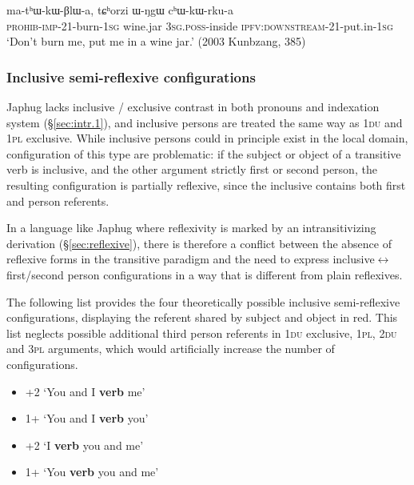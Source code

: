 \begin{exe}
\ex   \label{ex:mathWkWBlWa}
\gll ma-tʰɯ-kɯ-βlɯ-a, tɕʰorzi ɯ-ŋgɯ cʰɯ-kɯ-rku-a \\
\textsc{prohib}-\textsc{imp}-2\fl{}1-burn-\textsc{1sg} wine.jar \textsc{3sg}.\textsc{poss}-inside  \textsc{ipfv}:\textsc{downstream}-2\fl{}1-put.in-\textsc{1sg} \\
\glt `Don't burn me, put me in a wine jar.' (2003 Kunbzang, 385)
\end{exe}

\subsubsection{Inclusive semi-reflexive configurations} \label{sec:incl.semi.reflexive}
Japhug lacks inclusive / exclusive contrast in both pronouns and indexation system (§\ref{sec:intr.1}), and inclusive persons are treated the same way as \textsc{1du} and \textsc{1pl} exclusive. While inclusive persons could in principle exist in the local domain, configuration of this type are problematic: if the subject or object of a transitive verb is inclusive, and the other argument strictly first or second person, the resulting configuration is partially reflexive, since the inclusive contains both first and person referents. 

In a language like Japhug where reflexivity is marked by an intransitivizing derivation (§\ref{sec:reflexive}), there is therefore a conflict between the absence of reflexive forms in the transitive paradigm and the need to express inclusive$\leftrightarrow$first/second person configurations in a way that is different from plain reflexives.

The following list provides the four theoretically possible inclusive semi-reflex\-ive configurations, displaying the referent shared by subject and object in red. This list neglects possible additional third person referents in \textsc{1du} exclusive, \textsc{1pl}, \textsc{2du} and \textsc{3pl} arguments, which would artificially increase the number of configurations.

\begin{itemize}
\item {}+2\fl{} `You and I \textbf{verb} me'
\item 1+\fl{} `You and I \textbf{verb} you'
\item {}\fl{}+2 `I \textbf{verb} you and me'
\item {}\fl{}1+ `You \textbf{verb} you and me'
\end{itemize}

